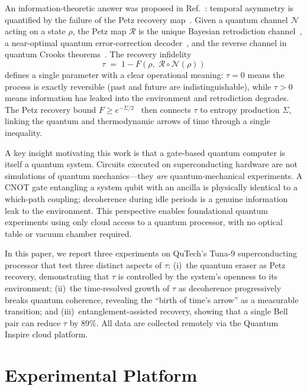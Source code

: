 \documentclass[prl,twocolumn,superscriptaddress,longbibliography,floatfix]{revtex4-2}
\newcommand{\tauasym}{\tau}
\newcommand{\Petz}{\mathcal{R}}
\newcommand{\chan}{\mathcal{N}}
\begin{document}
An information-theoretic answer was proposed in
Ref.~\cite{Huang2026}: temporal asymmetry is quantified by the
failure of the Petz recovery map~\cite{Petz1986,Petz1988}.  Given
a quantum channel $\chan$ acting on a state $\rho$, the Petz map
$\Petz$ is the unique Bayesian retrodiction
channel~\cite{Parzygnat2023}, a near-optimal quantum
error-correction decoder~\cite{Barnum2002}, and the reverse channel
in quantum Crooks theorems~\cite{JRSWW2018}.  The recovery
infidelity
\begin{equation}\label{eq:tau_def}
  \tauasym \;=\; 1 - F\!\left(\rho,\;
    \Petz\circ\chan(\rho)\right)
\end{equation}
defines a single parameter with a clear operational meaning:
$\tauasym = 0$ means the process is exactly reversible (past and
future are indistinguishable), while $\tauasym > 0$ means
information has leaked into the environment and retrodiction
degrades.  The Petz recovery bound
$F \geq e^{-\Sigma/2}$~\cite{JRSWW2018,Fawzi2015} then connects
$\tauasym$ to entropy production $\Sigma$, linking the quantum and
thermodynamic arrows of time through a single inequality.

A key insight motivating this work is that a gate-based quantum
computer is itself a quantum system.  Circuits executed on
superconducting hardware are not simulations of quantum
mechanics---they \emph{are} quantum-mechanical experiments.  A CNOT
gate entangling a system qubit with an ancilla is physically
identical to a which-path coupling; decoherence during idle periods
is a genuine information leak to the environment.  This perspective
enables foundational quantum experiments using only cloud access to
a quantum processor, with no optical table or vacuum chamber
required.

In this paper, we report three experiments on QuTech's Tuna-9
superconducting processor that test three distinct aspects of
$\tauasym$: (i)~the quantum eraser as Petz recovery, demonstrating
that $\tauasym$ is controlled by the system's openness to its
environment; (ii)~the time-resolved growth of $\tauasym$ as
decoherence progressively breaks quantum coherence, revealing the
``birth of time's arrow'' as a measurable transition; and
(iii)~entanglement-assisted recovery, showing that a single Bell
pair can reduce $\tauasym$ by 89\%.  All data are collected
remotely via the Quantum Inspire cloud platform.

\section{Experimental Platform}
\label{sec:platform}
\end{document}
